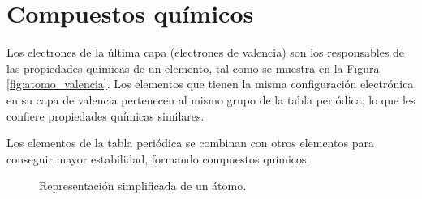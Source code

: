 

\section{Compuestos químicos}
\begin{minipage}{0.45\textwidth}
    Los electrones de la última capa (electrones de valencia) son los responsables de las propiedades químicas de un elemento, tal como se muestra en la Figura \eqref{fig:atomo_valencia}.
    Los elementos que tienen la misma configuración electrónica en su capa de valencia pertenecen al mismo grupo de la tabla periódica, lo que les confiere propiedades químicas similares.

    Los elementos de la tabla periódica se combinan con otros elementos para conseguir mayor estabilidad, formando compuestos químicos.

\end{minipage}
\hfill
\begin{minipage}{0.45\textwidth}
    \begin{figure}[H]
        \vspace{-12pt}
        \centering
        \caption{Representación simplificada de un átomo.}
        \label{fig:atomo_valencia}
    \end{figure}
\end{minipage}
